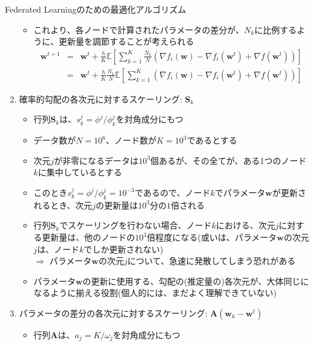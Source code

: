 \documentclass[dvipdfmx,notheorems,t]{beamer}
\begin{document}
\begin{frame}{Federated Learningのための最適化アルゴリズム}
\begin{enumerate}
\begin{itemize}
		\framebreak
		
		\item これより、各ノードで計算されたパラメータの差分が、$N_k$に比例するように、更新量を調節することが考えられる
		\begin{eqnarray}
			\bm{w}^{t + 1} &=& \bm{w}^t + \frac{h}{K} \mathbb{E} \left[ \sum_{k = 1}^K \frac{N_k}{N} \left( \nabla f_i(\bm{w}) - \nabla f_i(\bm{w}^t) + \nabla f(\bm{w}^t) \right) \right] \nonumber \\
			&=& \bm{w}^t + \frac{h}{K} \frac{N_k}{N} \mathbb{E} \left[ \sum_{k = 1}^K \left( \nabla f_i(\bm{w}) - \nabla f_i(\bm{w}^t) + \nabla f(\bm{w}^t) \right) \right] \nonumber
		\end{eqnarray}
	\end{itemize}
	
	\framebreak
	
	\item 確率的勾配の各次元に対するスケーリング: $\bm{S}_k$
	\begin{itemize}
		\item 行列$\bm{S}_k$は、$s_k^j = \phi^j / \phi_k^j$を対角成分にもつ
		\newline
		
		\item データ数が$N = 10^6$、ノード数が$K = 10^3$であるとする
		\item 次元$j$が非零になるデータは$10^3$個あるが、その全てが、ある1つのノード$k$に集中しているとする
		\item このとき$s_k^j = \phi^j / \phi_k^j = 10^{-3}$であるので、ノード$k$でパラメータ$\bm{w}$が更新されるとき、次元$j$の更新量は$10^3$分の$1$倍される
		\newline
		
		\item 行列$\bm{S}_k$でスケーリングを行わない場合、ノード$k$における、次元$j$に対する更新量は、他のノードの$10^3$倍程度になる(或いは、パラメータ$\bm{w}$の次元$j$は、ノード$k$でしか更新されない) \\
		$\Rightarrow$ パラメータ$\bm{w}$の次元$j$について、急速に発散してしまう恐れがある
		\newline
		
		\item パラメータ$\bm{w}$の更新に使用する、勾配の(推定量の)各次元が、大体同じになるように揃える役割(個人的には、まだよく理解できていない)
	\end{itemize}
	
	\framebreak
	
	\item パラメータの差分の各次元に対するスケーリング: $\bm{A} \left( \bm{w}_k - \bm{w}^t \right)$
	\begin{itemize}
		\item 行列$\bm{A}$は、$a_j = K / \omega_j$を対角成分にもつ
		\newline
		

\end{itemize}
\end{enumerate}
\end{frame}
\end{document}
